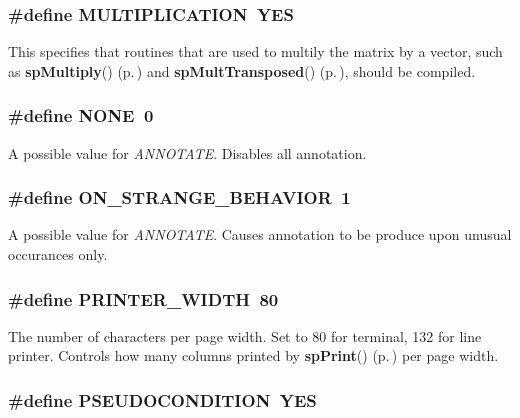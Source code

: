 \subsubsection{\setlength{\rightskip}{0pt plus 5cm}\#define MULTIPLICATION\ YES}\label{spConfig_8h_a14}


This specifies that routines that are used to multily the matrix by a vector, such as {\bf sp\-Multiply}() {\rm (p.\,\pageref{spUtils_8c_a14})} and {\bf sp\-Mult\-Transposed}() {\rm (p.\,\pageref{spUtils_8c_a15})}, should be compiled. 
\subsubsection{\setlength{\rightskip}{0pt plus 5cm}\#define NONE\ 0}\label{spConfig_8h_a46}


A possible value for {\em ANNOTATE}. Disables all annotation. 
\subsubsection{\setlength{\rightskip}{0pt plus 5cm}\#define ON\_\-STRANGE\_\-BEHAVIOR\ 1}\label{spConfig_8h_a47}


A possible value for {\em ANNOTATE}. Causes annotation to be produce upon unusual occurances only. 
\subsubsection{\setlength{\rightskip}{0pt plus 5cm}\#define PRINTER\_\-WIDTH\ 80}\label{spConfig_8h_a33}


The number of characters per page width. Set to 80 for terminal, 132 for line printer. Controls how many columns printed by {\bf sp\-Print}() {\rm (p.\,\pageref{spOutput_8c_a3})} per page width. 
\subsubsection{\setlength{\rightskip}{0pt plus 5cm}\#define PSEUDOCONDITION\ YES}\label{spConfig_8h_a18}


